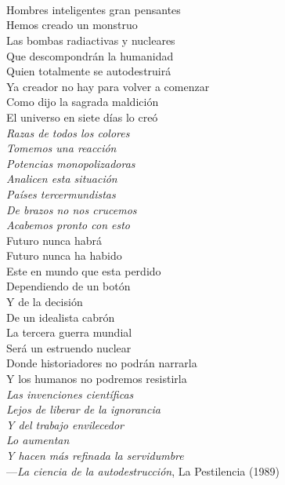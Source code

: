 \newpage
\thispagestyle{empty} \textbf{}\normalsize
\\\\\\%

\begin{flushright}
\begin{minipage}{10cm}
    \noindent
    \small
    Hombres inteligentes gran pensantes\\
    Hemos creado un monstruo\\
    Las bombas radiactivas y nucleares\\
    Que descompondrán la humanidad\\
    Quien totalmente se autodestruirá\\
    
    Ya creador no hay para volver a comenzar\\
    Como dijo la sagrada maldición\\
    El universo en siete días lo creó\\
    
    \emph{Razas de todos los colores\\
    Tomemos una reacción\\
    Potencias monopolizadoras\\
    Analicen esta situación\\
    Países tercermundistas\\
    De brazos no nos crucemos\\
    Acabemos pronto con esto}\\
    
    Futuro nunca habrá\\
    Futuro nunca ha habido\\
    Este en mundo que esta perdido\\
    Dependiendo de un botón\\
    Y de la decisión\\
    De un idealista cabrón\\
    
    La tercera guerra mundial\\
    Será un estruendo nuclear\\
    Donde historiadores no podrán narrarla\\
    Y los humanos no podremos resistirla\\
    
    \emph{Las invenciones científicas\\
    Lejos de liberar de la ignorancia\\
    Y del trabajo envilecedor\\
    Lo aumentan\\
    Y hacen más refinada la servidumbre}\\
    
    ---\emph{La ciencia de la autodestrucción}, La Pestilencia (1989)\\
\end{minipage}
\end{flushright}

